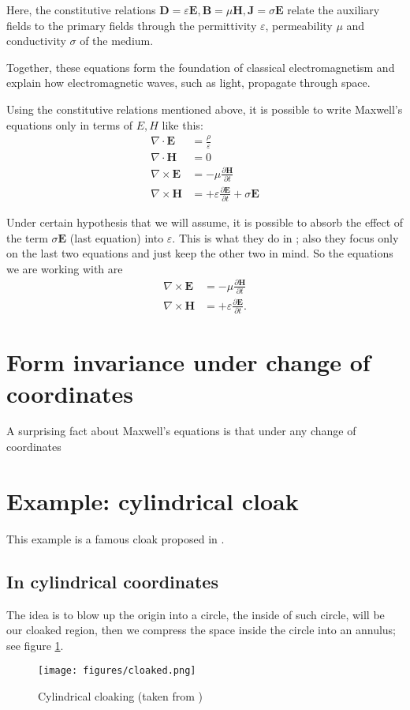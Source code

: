 \documentclass{amsart}
\begin{document}
Here, the constitutive relations \(\mathbf{D} = \varepsilon \mathbf{E},
\mathbf{B}=\mu \mathbf{H},\mathbf{J}=\sigma \mathbf{E}\) relate the auxiliary fields to the primary fields 
through the permittivity \(\varepsilon\), permeability \(\mu\) and conductivity \(\sigma\) of the medium.

Together, these equations form the foundation of classical electromagnetism and explain how electromagnetic waves, such as light, propagate through space.

\newpage

Using the constitutive relations mentioned above, it is possible to write Maxwell's equations only in terms of \(E,H\) like this:
\begin{align*}
  \nabla \cdot \mathbf{E} &=\frac{\rho}{\varepsilon}\\
  \nabla \cdot \mathbf{H} &=0\\
  \nabla \times \mathbf{E} &= -\mu\frac{\partial \mathbf{H}}{\partial t}\\
  \nabla \times \mathbf{H} &= +\varepsilon\frac{\partial \mathbf{E}}{\partial t} + \sigma \mathbf{E}
\end{align*}

Under certain hypothesis that we will assume, it is possible to absorb the effect of
the term \(\sigma\mathbf{E}\) (last equation) into \(\varepsilon\).
This is what they do in \cite{ward96}; also they focus only on the last two equations and just keep the other two in mind.
So the equations we are working with are
\begin{align*}
  \nabla \times \mathbf{E} &= -\mu\frac{\partial \mathbf{H}}{\partial t}\\
  \nabla \times \mathbf{H} &= +\varepsilon\frac{\partial \mathbf{E}}{\partial t}.
\end{align*}

\section{Form invariance under change of coordinates} A surprising fact about Maxwell's equations is that under any change of
coordinates 

\section{Example: cylindrical cloak}

This example is a famous cloak proposed in \cite{schurig06}.
\subsection{In cylindrical coordinates}
The idea is to blow up the origin into a circle, the inside of such circle, will be our cloaked region,
then we compress the space inside the circle into an annulus; see figure \ref{fig:cloak}.
\begin{figure}
  \begin{center}
    \texttt{[image: figures/cloaked.png]}
  \end{center}
  \caption{Cylindrical cloaking (taken from \cite{schurig06})}\label{fig:cloak}
\end{figure}
\end{document}
